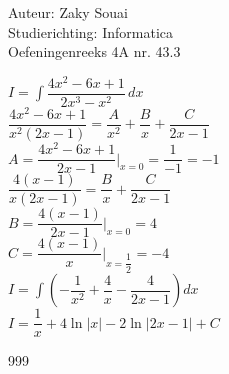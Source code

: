 \documentclass[a4paper]{article}
\begin{document}
  
\noindent \large Auteur: Zaky Souai \\
\noindent \large Studierichting:  Informatica\\
\noindent \large Oefeningenreeks 4A nr. 43.3\\

\bigskip

\normalsize

$\displaystyle I=\int \dfrac{4x^2-6x+1}{2x^3-x^2}\,dx$\\

$\displaystyle \dfrac{4x^2-6x+1}{x^2(2x-1)}=\dfrac{A}{x^2}+\dfrac{B}{x}+\dfrac{C}{2x-1}$\\

$\displaystyle A=\dfrac{4x^2-6x+1}{2x-1}|_{x=0}=\dfrac{1}{-1}=-1$\\

$\displaystyle \dfrac{4(x-1)}{x(2x-1)}=\dfrac{B}{x}+\dfrac{C}{2x-1}$\\

$\displaystyle B=\dfrac{4(x-1)}{2x-1}|_{x=0} = 4$\\

$\displaystyle C=\dfrac{4(x-1)}{x}|_{x=\dfrac{1}{2}}=-4$\\

$\displaystyle I=\int\left(-\dfrac{1}{x^2}+\dfrac{4}{x}-\dfrac{4}{2x-1}\right)dx$\\

$\displaystyle I=\dfrac{1}{x}+4\ln|x|-2\ln|2x-1|+C$


\begin{thebibliography}{999}
\end{thebibliography}
\end{document}
